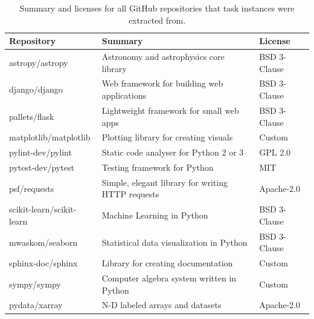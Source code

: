 \begin{table}[ht]
\centering
\begin{tabular}{l|ll}
\toprule
    Repository & Summary & License \\
\midrule
    astropy/astropy & Astronomy and astrophysics core library & BSD 3-Clause \\
    django/django & Web framework for building web applications & BSD 3-Clause \\
    pallets/flask & Lightweight framework for small web apps & BSD 3-Clause \\
    matplotlib/matplotlib & Plotting library for creating visuals & Custom \\
    pylint-dev/pylint & Static code analyser for Python 2 or 3 & GPL 2.0 \\
    pytest-dev/pytest & Testing framework for Python & MIT \\
    psf/requests & Simple, elegant library for writing HTTP requests & Apache-2.0 \\
    scikit-learn/scikit-learn & Machine Learning in Python & BSD 3-Clause \\
    mwaskom/seaborn & Statistical data visualization in Python & BSD 3-Clause \\
    sphinx-doc/sphinx & Library for creating documentation & Custom \\
    sympy/sympy & Computer algebra system written in Python & Custom \\
    pydata/xarray & N-D labeled arrays and datasets & Apache-2.0 \\
\bottomrule
\end{tabular}
\caption{Summary and licenses for all GitHub repositories that task instances were extracted from.}
\label{table:repo-summaries}
\end{table}